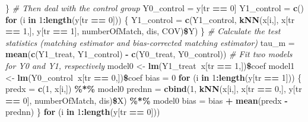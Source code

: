 \documentclass[]{article}
\newenvironment{Shaded}{\begin{snugshade}}{\end{snugshade}}
\newcommand{\KeywordTok}[1]{\textcolor[rgb]{0.13,0.29,0.53}{\textbf{#1}}}
\newcommand{\DecValTok}[1]{\textcolor[rgb]{0.00,0.00,0.81}{#1}}
\newcommand{\StringTok}[1]{\textcolor[rgb]{0.31,0.60,0.02}{#1}}
\newcommand{\CommentTok}[1]{\textcolor[rgb]{0.56,0.35,0.01}{\textit{#1}}}
\newcommand{\ControlFlowTok}[1]{\textcolor[rgb]{0.13,0.29,0.53}{\textbf{#1}}}
\newcommand{\OperatorTok}[1]{\textcolor[rgb]{0.81,0.36,0.00}{\textbf{#1}}}
\newcommand{\NormalTok}[1]{#1}
\begin{document}
\begin{Shaded}
\begin{Highlighting}[]
\NormalTok{  \}}
  \CommentTok{# Then deal with the control group}
\NormalTok{  Y0_control =}\StringTok{ }\NormalTok{y[tr }\OperatorTok{==}\StringTok{ }\DecValTok{0}\NormalTok{]}
\NormalTok{  Y1_control =}\StringTok{ }\KeywordTok{c}\NormalTok{()}
  \ControlFlowTok{for}\NormalTok{ (i }\ControlFlowTok{in} \DecValTok{1}\OperatorTok{:}\KeywordTok{length}\NormalTok{(y[tr }\OperatorTok{==}\StringTok{ }\DecValTok{0}\NormalTok{]))}
\NormalTok{  \{}
\NormalTok{    Y1_control =}\StringTok{ }\KeywordTok{c}\NormalTok{(Y1_control, }\KeywordTok{kNN}\NormalTok{(x[i,], x[tr }\OperatorTok{==}\StringTok{ }\DecValTok{1}\NormalTok{,], y[tr }\OperatorTok{==}\StringTok{ }\DecValTok{1}\NormalTok{], numberOfMatch, dis, COV)}\OperatorTok{\$}\NormalTok{Y)}
\NormalTok{  \}}
  \CommentTok{# Calculate the test statistics (matching estimator and bias-corrected matching estimator)}
\NormalTok{  tau_m =}\StringTok{ }\KeywordTok{mean}\NormalTok{(}\KeywordTok{c}\NormalTok{(Y1_treat, Y1_control) }\OperatorTok{-}\StringTok{ }\KeywordTok{c}\NormalTok{(Y0_treat, Y0_control))}
    \CommentTok{# Fit two models for Y0 and Y1, respectively }
\NormalTok{  model0 <-}\StringTok{ }\KeywordTok{lm}\NormalTok{(Y1_treat}\OperatorTok{~}\NormalTok{x[tr }\OperatorTok{==}\StringTok{ }\DecValTok{1}\NormalTok{,])}\OperatorTok{\$}\NormalTok{coef}
\NormalTok{  model1 <-}\StringTok{ }\KeywordTok{lm}\NormalTok{(Y0_control}\OperatorTok{~}\NormalTok{x[tr }\OperatorTok{==}\StringTok{ }\DecValTok{0}\NormalTok{,])}\OperatorTok{\$}\NormalTok{coef}
\NormalTok{  bias =}\StringTok{ }\DecValTok{0}
  \ControlFlowTok{for}\NormalTok{ (i }\ControlFlowTok{in} \DecValTok{1}\OperatorTok{:}\KeywordTok{length}\NormalTok{(y[tr }\OperatorTok{==}\StringTok{ }\DecValTok{1}\NormalTok{]))}
\NormalTok{  \{}
\NormalTok{    predx =}\StringTok{ }\KeywordTok{c}\NormalTok{(}\DecValTok{1}\NormalTok{, x[i,]) }\OperatorTok{\%*\%}\StringTok{ }\NormalTok{model0}
\NormalTok{    prednn =}\StringTok{ }\KeywordTok{cbind}\NormalTok{(}\DecValTok{1}\NormalTok{, }\KeywordTok{kNN}\NormalTok{(x[i,], x[tr }\OperatorTok{==}\StringTok{ }\DecValTok{0}\NormalTok{,], y[tr }\OperatorTok{==}\StringTok{ }\DecValTok{0}\NormalTok{], numberOfMatch, dis)}\OperatorTok{\$}\NormalTok{X) }\OperatorTok{\%*\%}\StringTok{ }\NormalTok{model0}
\NormalTok{    bias =}\StringTok{ }\NormalTok{bias }\OperatorTok{+}\StringTok{ }\KeywordTok{mean}\NormalTok{(predx }\OperatorTok{-}\StringTok{ }\NormalTok{prednn)}
\NormalTok{  \}}
  \ControlFlowTok{for}\NormalTok{ (i }\ControlFlowTok{in} \DecValTok{1}\OperatorTok{:}\KeywordTok{length}\NormalTok{(y[tr }\OperatorTok{==}\StringTok{ }\DecValTok{0}\NormalTok{]))}

\end{Highlighting}
\end{Shaded}
\end{document}
